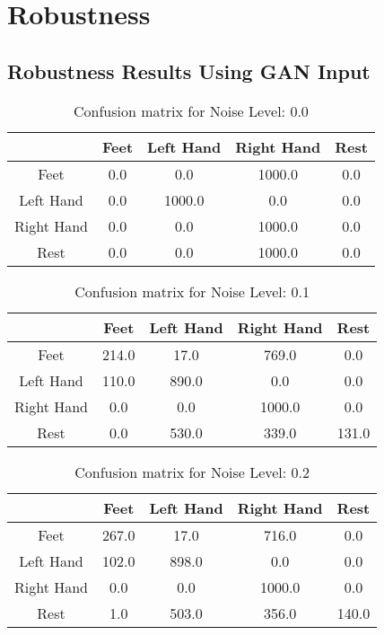 \chapter{Robustness}\label{app:robustness}

\section{Robustness Results Using GAN Input}\label{app:gan_robustness}
\begin{table}[!htbp]
    \centering
    \begin{tabular}{|c||c|c|c|c|}
        \hline
		 & Feet & Left Hand & Right Hand & Rest \\
        \hline
        \hline
        Feet & 0.0 & 0.0 & 1000.0 & 0.0 \\
        \hline
        Left Hand & 0.0 & 1000.0 & 0.0 & 0.0 \\
        \hline
        Right Hand & 0.0 & 0.0 & 1000.0 & 0.0 \\
        \hline
        Rest & 0.0 & 0.0 & 1000.0 & 0.0 \\
        \hline
    \end{tabular}
    \caption{Confusion matrix for Noise Level: 0.0}
\end{table}

\begin{table}[!htbp]
    \centering
    \begin{tabular}{|c||c|c|c|c|}
        \hline
		 & Feet & Left Hand & Right Hand & Rest \\
        \hline
        \hline
        Feet & 214.0 & 17.0 & 769.0 & 0.0 \\
        \hline
        Left Hand & 110.0 & 890.0 & 0.0 & 0.0 \\
        \hline
        Right Hand & 0.0 & 0.0 & 1000.0 & 0.0 \\
        \hline
        Rest & 0.0 & 530.0 & 339.0 & 131.0 \\
        \hline
    \end{tabular}
    \caption{Confusion matrix for Noise Level: 0.1}
\end{table}

\begin{table}[!htbp]
    \centering
    \begin{tabular}{|c||c|c|c|c|}
        \hline
		 & Feet & Left Hand & Right Hand & Rest \\
        \hline
        \hline
        Feet & 267.0 & 17.0 & 716.0 & 0.0 \\
        \hline
        Left Hand & 102.0 & 898.0 & 0.0 & 0.0 \\
        \hline
        Right Hand & 0.0 & 0.0 & 1000.0 & 0.0 \\
        \hline
        Rest & 1.0 & 503.0 & 356.0 & 140.0 \\
        \hline
    \end{tabular}
    \caption{Confusion matrix for Noise Level: 0.2}
\end{table}

